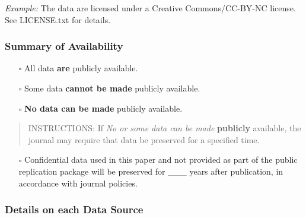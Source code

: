 \documentclass[
]{article}
\providecommand{\tightlist}{%
  \setlength{\itemsep}{0pt}\setlength{\parskip}{0pt}}
\begin{document}
\emph{Example:} The data are licensed under a Creative Commons/CC-BY-NC
license. See LICENSE.txt for details.

\hypertarget{summary-of-availability}{%
\subsubsection{Summary of Availability}\label{summary-of-availability}}

\begin{itemize}
\tightlist
\item[$\square$]
  All data \textbf{are} publicly available.
\item[$\square$]
  Some data \textbf{cannot be made} publicly available.
\item[$\square$]
  \textbf{No data can be made} publicly available.
\end{itemize}

\begin{quote}
INSTRUCTIONS: If \emph{No or some data can be made} \textbf{publicly}
available, the journal may require that data be preserved for a
specified time.
\end{quote}

\begin{itemize}
\tightlist
\item[$\square$]
  Confidential data used in this paper and not provided as part of the
  public replication package will be preserved for \_\_\_ years after
  publication, in accordance with journal policies.
\end{itemize}

\hypertarget{details-on-each-data-source}{%
\subsubsection{Details on each Data
Source}\label{details-on-each-data-source}}
\end{document}
